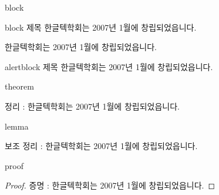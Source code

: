 \documentclass[ aspectratio=169,  10pt,blue,xcolor=pdftex,dvipsnames,table,handout,notes]{beamer}
\begin{document}

		\begin{frame}[t]{block}

			\begin{block} {block 제목}
			한글텍학회는 2007년 1월에 창립되었읍니다.	
			\end{block}

			\begin{example}
			한글텍학회는 2007년 1월에 창립되었읍니다.	
			\end{example}

			\begin{alertblock} {alertblock 제목}
			한글텍학회는 2007년 1월에 창립되었읍니다.	
			\end{alertblock}

		\end{frame}

		\begin{frame}[t]{theorem}
			\begin{theorem}
			정리 : 한글텍학회는 2007년 1월에 창립되었읍니다.	
			\end{theorem}
		\end{frame}

		\begin{frame}[t]{lemma}

			\begin{lemma}
			보조 정리 :  한글텍학회는 2007년 1월에 창립되었읍니다.	
			\end{lemma}

		\end{frame}


		\begin{frame}[t]{proof}

			\begin{proof}
			증명 : 한글텍학회는 2007년 1월에 창립되었읍니다.	
			\end{proof}

		\end{frame}
\end{document}

